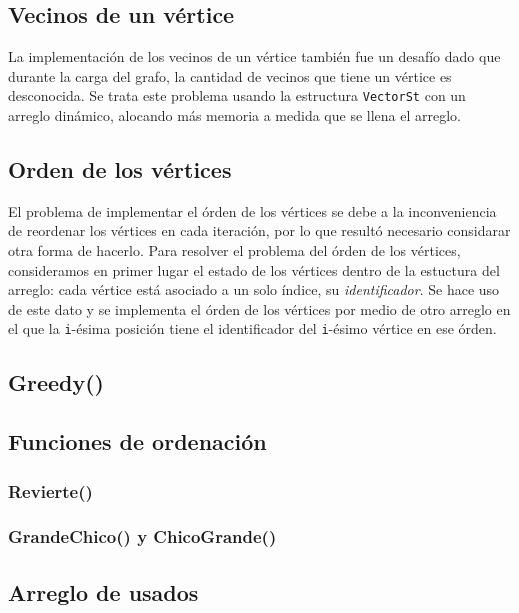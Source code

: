 \documentclass[11pt,a4paper]{article}
\theoremstyle{plain}
\begin{document}
	\subsection{Vecinos de un vértice}

La implementación de los vecinos de un vértice también fue un desafío dado que durante la carga del grafo, la cantidad de vecinos que tiene un vértice es desconocida. Se trata este problema usando la estructura \texttt{VectorSt} con un arreglo dinámico, alocando más memoria a medida que se llena el arreglo.

	\subsection{Orden de los vértices}

El problema de implementar el órden de los vértices se debe a la inconveniencia de reordenar los vértices en cada iteración, por lo que resultó necesario considarar otra forma de hacerlo. Para resolver el problema del órden de los vértices, consideramos en primer lugar el estado de los vértices dentro de la estuctura del arreglo: cada vértice está asociado a un solo índice, su \emph{identificador}. Se hace uso de este dato y se implementa el órden de los vértices por medio de otro arreglo en el que la \texttt{i}-ésima posición tiene el identificador del \texttt{i}-ésimo vértice en ese órden.

	\subsection{Greedy()}


	\subsection{Funciones de ordenación}

		\subsubsection{Revierte()}

		\subsubsection{GrandeChico() y ChicoGrande()}
	
	\subsection{Arreglo de usados}
	\label{sec:7.6}
\end{document}
